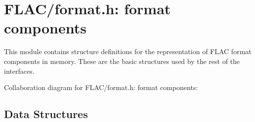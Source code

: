 \hypertarget{group__flac__format}{}\section{F\+L\+A\+C/format.h\+: format components}
\label{group__flac__format}


This module contains structure definitions for the representation of F\+L\+AC format components in memory. These are the basic structures used by the rest of the interfaces.  


Collaboration diagram for F\+L\+A\+C/format.h\+: format components\+:
\subsection*{Data Structures}
